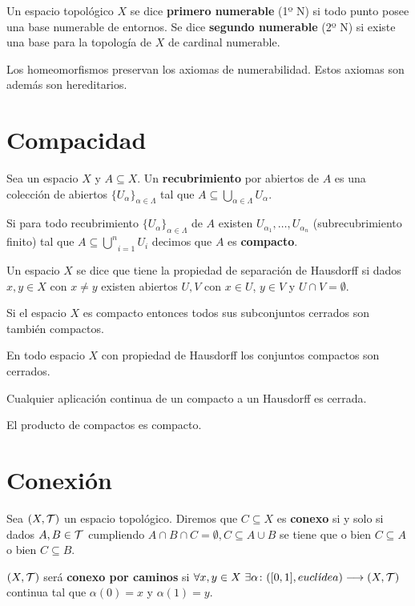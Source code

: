 \documentclass[GTS.tex]{subfiles}
\begin{document}
\begin{defi}
Un espacio topológico $X$ se dice \textbf{primero numerable} (1º N) si todo punto posee una base numerable de entornos. Se dice \textbf{segundo numerable} (2º N) si existe una base para la topología de $X$ de cardinal numerable.
\end{defi}

\begin{prop}
Los homeomorfismos preservan los axiomas de numerabilidad. Estos axiomas son además son hereditarios.
\end{prop}

\section{Compacidad}
\begin{defi}Sea un espacio $X$ y $A\subseteq X$. Un \textbf{recubrimiento} por abiertos de $A$ es una colección de abiertos $\{U_\alpha\}_{\alpha\in\Lambda}$ tal que $A\subseteq\underset{\alpha\in\Lambda}{\bigcup}U_\alpha$.
\end{defi}
\begin{defi} Si para todo recubrimiento $\{U_\alpha\}_{\alpha\in\Lambda}$ de $A$ existen $U_{\alpha_1},\dots,U_{\alpha_n}$ (subrecubrimiento finito) tal que $A\subseteq\underset{i=1}{\overset{n}{\bigcup}}U_i$ decimos que $A$ es \textbf{compacto}.
\end{defi}
\begin{defi} Un espacio $X$ se dice que tiene la propiedad de separación de Hausdorff si dados $x,y\in X$ con $x\neq y$ existen abiertos $U,V$ con $x\in U$, $y\in V$ y $U\cap V=\emptyset$.
\end{defi}
Si el espacio $X$ es compacto entonces todos sus subconjuntos cerrados son también compactos.
\begin{prop} En todo espacio $X$ con propiedad de Hausdorff los conjuntos compactos son cerrados.
\end{prop}

\begin{prop}
Cualquier aplicación continua de un compacto a un Hausdorff es cerrada.
\end{prop}

\begin{teorema}[Tychonoff]
El producto de compactos es compacto.
\end{teorema}

\section{Conexión}
\begin{defi} Sea $(X,\mathcal{T})$ un espacio topológico. Diremos que $C\subseteq X$ es \textbf{conexo} si y solo si dados $A,B\in\mathcal{T}$ cumpliendo $A\cap B\cap C=\emptyset, C\subseteq A\cup B$ se tiene que o bien $C\subseteq A$ o bien $C\subseteq B$.
\end{defi}
\begin{defi} $(X,\mathcal{T})$ será \textbf{conexo por caminos} si $\forall x,y\in X\ \exists\alpha\func{([0,1],eucl\acute{\imath}dea)}{(X,\Tau)}$ continua tal que $\alpha(0)=x$ y $\alpha(1)=y$.
\end{defi}
\end{document}
